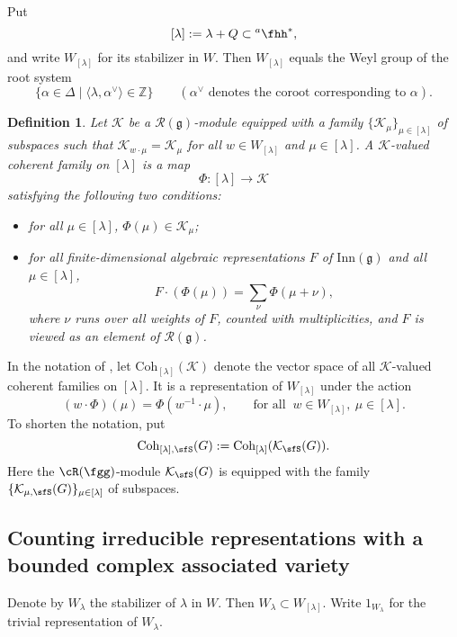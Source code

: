 \documentclass[12pt,a4paper]{amsart}
\newcommand{\CK}{{\mathcal {K}}}
\newcommand{\g}{\mathfrak g}
\newcommand{\Z}{\mathbb{Z}}
\numberwithin{equation}{section}
\newtheorem{defn}[thm]{Definition}
\theoremstyle{remark}
\def\hha{{}^a\fhh}
\def\Coh{\mathrm{Coh}}
\newcommand{\Lam}{{[\lambda]}}
\newcommand{\Rg}{\cR(\fgg)}
\begin{document}
Put
\[
\Lam:=\lambda+Q\subset \hha^*,
\]
 and write $W_\Lam$
for its stabilizer in $W$. Then $W_\Lam$ equals the Weyl group of the root
system
\[
  \{\alpha \in \Delta\mid \langle \lambda, \alpha^\vee\rangle \in \Z\}\qquad (\alpha^\vee \textrm{ denotes the coroot corresponding to $\alpha$}).
\]


\begin{defn}\label{defcoh}
  Let $\CK$ be a $\mathcal R(\g)$-module equipped with a family
  $\{\CK_\mu\}_{\mu\in \Lam}$ of subspaces such that $\CK_{w\cdot \mu}=\CK_\mu$
  for all $w\in W_\Lam$ and $\mu\in \Lam$. A $\CK$-valued coherent family on
  $\Lam$ is a map
  \[
    \Phi: \Lam\rightarrow \CK%
  \]
  satisfying the following two conditions:
  \begin{itemize}
    \item for all $\mu\in \Lam$, $\Phi(\mu)\in \CK_\mu$;
    \item for all finite-dimensional algebraic representations $F$ of $\mathrm{Inn}(\g)$
          and all $\mu\in \Lam$,
          \[
          F\cdot (\Phi(\mu)) = \sum_{\nu} \Phi(\mu+\nu),
          \]
          where $\nu$ runs over all weights of $F$, counted with multiplicities,
          and $F$ is viewed as an element of $\mathcal R(\g)$.
  \end{itemize}
\end{defn}


In the notation of , let $\Coh_{\Lam}(\CK)$ denote the
vector space of all $\mathcal K$-valued coherent families on $\Lam$. It is a
representation of $W_{\Lam}$ under the action
\[
  (w\cdot \Phi)(\mu) = \Phi(w^{-1}\cdot \mu), \qquad \textrm{for all
  }\ w\in W_\Lam, \ \mu\in \Lam.
\]
To shorten the notation, put
\[
  \Coh_{\Lam,\sfS}(G):=\Coh_{\Lam}(\CK_\sfS(G)).
\]
Here the $\Rg$-module $\CK_\sfS(G)$ is equipped with the family $\{\CK_{\mu, \sfS}(G)\}_{\mu\in \Lam}$ of subspaces.

\subsection{Counting irreducible representations with a bounded complex
  associated variety}\label{sec12}

Denote by $W_\lambda$ the stabilizer of
$\lambda$ in $W$. Then $W_\lambda\subset W_\Lam$. Write $1_{W_\lambda}$ for the
trivial representation of $W_{\lambda}$.
\end{document}
